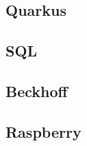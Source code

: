 \begin{spacing}{1}
    \section{Quarkus }\label{section:quarkus}
    \end{spacing}


\begin{spacing}{1}
    \section{SQL }\label{section:sql}
    \end{spacing}


\begin{spacing}{1}
    \section{Beckhoff }\label{section:allTechBeckhoff}
    \end{spacing}

 
\begin{spacing}{1}
    \section{Raspberry }\label{section:allTechRaspberry}
    \end{spacing}

 

